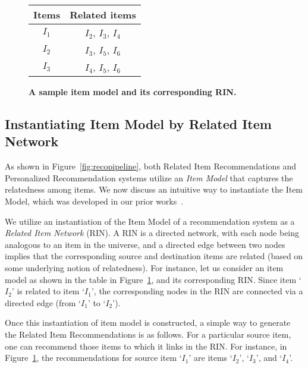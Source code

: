 \begin{figure}[tb] 
	\begin{tabular}{|c|c|}
		\hline
		Items & Related items \\
		\hline
		$I_1$  & $I_2$, $I_3$, $I_4$ \\
		\hline
		$I_2$  & $I_3$, $I_5$, $I_6$\\
		\hline
		$I_3$  & $I_4$, $I_5$, $I_6$ \\
		\hline
	\end{tabular}
	\quad
	\quad
	\caption{\bf A sample item model and its corresponding RIN.}
	\label{Fig:RINCreation}
	\vspace{-7mm}
\end{figure}


\subsection{Instantiating Item Model by Related Item Network}

As shown in Figure~\ref{fig:recopipeline}, 
both Related Item Recommendations and Personalized Recommendation systems utilize an {\it Item Model} that captures the relatedness among items.
We now discuss an intuitive way to instantiate the Item Model, which was developed in our prior works~\cite{dash2021umpire, dash2019network}.

We utilize an instantiation of the Item Model of a recommendation system as a {\it Related Item Network} (RIN). 
A RIN is a directed network, with each node being analogous to an item in the universe,  
and a directed edge between two nodes implies that the corresponding source and destination items are related (based on some underlying notion of relatedness).
For instance, let us consider an item model as shown in the table in Figure~\ref{Fig:RINCreation}, and its corresponding RIN. 
Since item `$I_2$' is related to item `$I_1$', the corresponding nodes in the RIN are connected via a directed edge (from `$I_1$' to `$I_2$').%

Once this instantiation of item model is constructed, a simple way to generate the Related Item Recommendations is as follows. For a particular source item, one can recommend those items to which it links in the RIN. For instance, in Figure~\ref{Fig:RINCreation}, the recommendations for source item `$I_1$' are items `$I_2$', `$I_3$', and `$I_4$'.



